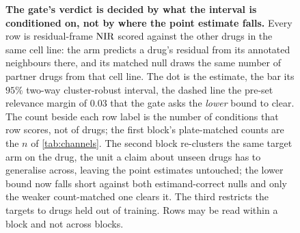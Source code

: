 \begin{figure}[htbp]
\begin{fullwidth}
\caption[The channel gate, by conditioning]{\textbf{The gate's verdict is decided
by what the interval is conditioned on, not by where the point estimate falls.}
Every row is residual-frame $\textrm{NIR}$ scored against the other drugs in the same
cell line: the arm predicts a drug's residual from its annotated neighbours
there, and its matched null draws the same number of partner drugs from that
cell line.
The dot is the estimate, the bar its $95\%$ two-way cluster-robust interval, the
dashed line the pre-set relevance margin of $0.03$ that the gate asks the
\emph{lower} bound to clear. The count beside each row label is the number of
conditions that row scores, not of drugs; the first block's plate-matched counts
are the $n$ of \cref{tab:channels}. The second block re-clusters the same target
arm on the drug, the unit a claim about unseen drugs has to generalise across,
leaving the point estimates untouched; the lower bound now falls short against both
estimand-correct nulls and only the weaker count-matched one clears it. The third
restricts the targets to drugs held out of training. Rows may be read within a
block and not across blocks.}
\label{fig:gate}
\end{fullwidth}
\end{figure}

